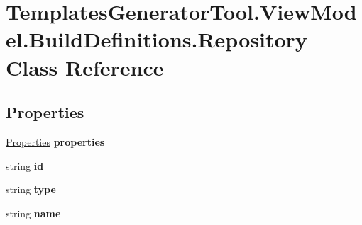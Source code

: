 \hypertarget{class_templates_generator_tool_1_1_view_model_1_1_build_definitions_1_1_repository}{}\section{Templates\+Generator\+Tool.\+View\+Model.\+Build\+Definitions.\+Repository Class Reference}
\label{class_templates_generator_tool_1_1_view_model_1_1_build_definitions_1_1_repository}
\subsection*{Properties}
\begin{DoxyCompactItemize}
\item 
\mbox{\label{class_templates_generator_tool_1_1_view_model_1_1_build_definitions_1_1_repository_ac6a6105ecc377510301cbc0f7ad8c204}} 
\mbox{\hyperlink{class_templates_generator_tool_1_1_view_model_1_1_build_definitions_1_1_properties}{Properties}} {\bfseries properties}
\item 
\mbox{\label{class_templates_generator_tool_1_1_view_model_1_1_build_definitions_1_1_repository_a6a53a0c182c6082b8345131f34343aef}} 
string {\bfseries id}
\item 
\mbox{\label{class_templates_generator_tool_1_1_view_model_1_1_build_definitions_1_1_repository_ab00c10c2d1097865a2f4b503ddec23e7}} 
string {\bfseries type}
\item 
\mbox{\label{class_templates_generator_tool_1_1_view_model_1_1_build_definitions_1_1_repository_a15876014833315f116ed47c3c674b59a}} 
string {\bfseries name}

\end{DoxyCompactItemize}
